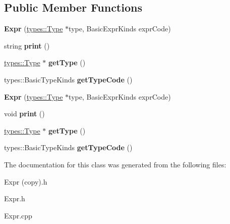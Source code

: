 \subsection*{Public Member Functions}
\begin{DoxyCompactItemize}
\item 
\mbox{\label{classspan_1_1ir_1_1expr_1_1Expr_a0993178d09f21dc6afd8f381db2ef109}} 
{\bfseries Expr} (\hyperlink{classspan_1_1ir_1_1types_1_1Type}{types\+::\+Type} $\ast$type, Basic\+Expr\+Kinds expr\+Code)
\item 
\mbox{\label{classspan_1_1ir_1_1expr_1_1Expr_adaa50ac1b56440f2c2210027793f304d}} 
string {\bfseries print} ()
\item 
\mbox{\label{classspan_1_1ir_1_1expr_1_1Expr_a498699f7d37feb602056dcc76bc5f3e2}} 
\hyperlink{classspan_1_1ir_1_1types_1_1Type}{types\+::\+Type} $\ast$ {\bfseries get\+Type} ()
\item 
\mbox{\label{classspan_1_1ir_1_1expr_1_1Expr_a060597873ffabf72a7827149a8d997b1}} 
types\+::\+Basic\+Type\+Kinds {\bfseries get\+Type\+Code} ()
\item 
\mbox{\label{classspan_1_1ir_1_1expr_1_1Expr_af8beed4c9324873f227c177ce71b12b0}} 
{\bfseries Expr} (\hyperlink{classspan_1_1ir_1_1types_1_1Type}{types\+::\+Type} $\ast$type, Basic\+Expr\+Kinds expr\+Code)
\item 
\mbox{\label{classspan_1_1ir_1_1expr_1_1Expr_a2f17543c09e42dfdb354b58d0a05877b}} 
void {\bfseries print} ()
\item 
\mbox{\label{classspan_1_1ir_1_1expr_1_1Expr_a5d21a4fa7eaefbf7d9804f307310e588}} 
\hyperlink{classspan_1_1ir_1_1types_1_1Type}{types\+::\+Type} $\ast$ {\bfseries get\+Type} ()
\item 
\mbox{\label{classspan_1_1ir_1_1expr_1_1Expr_a981199f2ab1c4cae88252b1db285cce2}} 
types\+::\+Basic\+Type\+Kinds {\bfseries get\+Type\+Code} ()
\end{DoxyCompactItemize}


The documentation for this class was generated from the following files\+:\begin{DoxyCompactItemize}
\item 
Expr (copy).\+h\item 
Expr.\+h\item 
Expr.\+cpp\end{DoxyCompactItemize}
